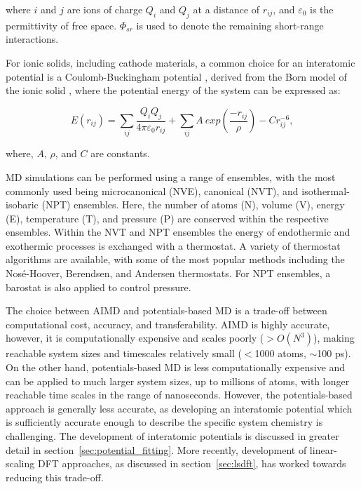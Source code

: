 \documentclass[../main.tex]{subfiles}
\begin{document}
where $i$ and $j$ are ions of charge $Q_i$ and $Q_j$ at a distance of $r_{ij}$, and $\varepsilon_0$ is the permittivity of free space. $\Phi_{sr}$ is used to denote the remaining short-range interactions.

For ionic solids, including cathode materials, a common choice for an interatomic potential is a Coulomb-Buckingham potential \cite{buckingham_classical_1938}, derived from the Born model of the ionic solid \cite{born_1932, mayer_1932}, where the potential energy of the system can be expressed as:

\begin{equation}
    E(r_{ij}) =  \sum_{ij} \frac{Q_i Q_j}{4\pi \varepsilon_0 r_{ij}} + \sum_{ij} A \ exp(\frac{-r_{ij}}{\rho}) - Cr_{ij}^{-6},
    \label{eqn:buckingham}
\end{equation}

where, $A$, $\rho$, and $C$ are constants.

MD simulations can be performed using a range of ensembles, with the most commonly used being microcanonical (NVE), canonical (NVT), and isothermal-isobaric (NPT) ensembles. \cite{todorov2006dl_poly_3, PLIMPTON19951, gale_gulp_1997} Here, the number of atoms (N), volume (V), energy (E), temperature (T), and pressure (P) are conserved within the respective ensembles. Within the NVT and NPT ensembles the energy of endothermic and exothermic processes is exchanged with a thermostat. A variety of thermostat algorithms are available, with some of the most popular methods including the Nos\'{e}-Hoover, Berendsen, and Andersen thermostats. \cite{todorov2006dl_poly_3, PLIMPTON19951, gale_gulp_1997} For NPT ensembles, a barostat is also applied to control pressure.

The choice between AIMD and potentials-based MD is a trade-off between computational cost, accuracy, and transferability. AIMD is highly accurate, however, it is computationally expensive and scales poorly ($>O(N^3)$), making reachable system sizes and timescales relatively small ($<$1000 atoms, $\sim$100 ps). On the other hand, potentials-based MD is less computationally expensive and can be applied to much larger system sizes, up to millions of atoms, with longer reachable time scales in the range of nanoseconds. However, the potentials-based approach is generally less accurate, as developing an interatomic potential which is sufficiently accurate enough to describe the specific system chemistry is challenging. The development of interatomic potentials is discussed in greater detail in section~\ref{sec:potential_fitting}. More recently, development of linear-scaling DFT approaches, as discussed in section~\ref{sec:lsdft}, has worked towards reducing this trade-off.
\end{document}
